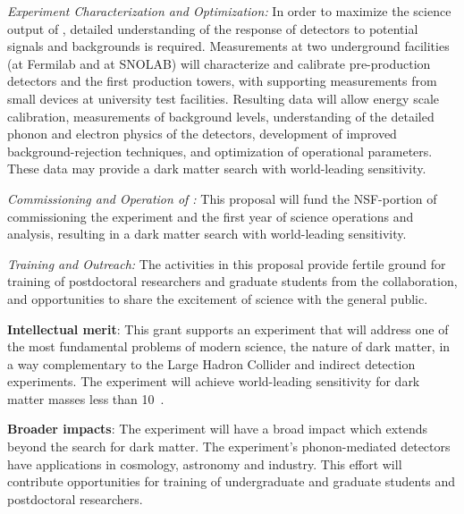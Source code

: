 {\it Experiment Characterization and Optimization:} In order to maximize the science output of \scs, detailed understanding of the response of detectors to potential signals and backgrounds is required. Measurements at two underground facilities (\nexus at Fermilab and \cute at SNOLAB) will characterize and calibrate pre-production \scs detectors and the first production \scs towers, with supporting measurements from small devices at university test facilities. Resulting data will allow energy scale calibration, measurements of background levels, understanding of the detailed phonon and electron physics of the detectors, 
development of improved background-rejection techniques,
and optimization of \scs operational parameters. 
These data may provide a dark matter search with world-leading sensitivity. 

{\it Commissioning and Operation of \scs:} This proposal will fund the NSF-portion of commissioning the \scs experiment and the 
first year of science operations and analysis, resulting in a dark matter search with world-leading sensitivity.

{\it Training and Outreach:} The activities in this proposal provide fertile ground for training of postdoctoral researchers and graduate students from the \SuperCDMS collaboration, and opportunities to share the excitement of science with the general public.

\textbf{Intellectual merit}: This grant supports an experiment that will address one of the most fundamental problems of modern science, the nature of dark matter, in a way complementary to the Large Hadron Collider and indirect detection experiments. The \scs experiment will achieve world-leading sensitivity for dark matter  masses less than 10~\gev.

\textbf{Broader impacts}: The \scs experiment will have a broad impact which extends beyond the search for dark matter. The experiment's phonon-mediated detectors have applications in cosmology, astronomy and industry. This effort will contribute opportunities for training of undergraduate and graduate students and postdoctoral researchers.


